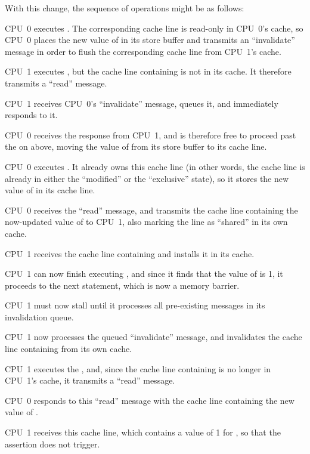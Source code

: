 \begin{fcvref}
With this change, the sequence of operations might be as follows:
\begin{sequence}
\item	CPU~0 executes .
	The corresponding cache line is read-only in CPU~0's cache,
	so CPU~0 places the new value of  in its store buffer and
	transmits an ``invalidate'' message in order to flush the
	corresponding cache line from CPU~1's cache.
\item	CPU~1 executes , but the cache line
	containing  is not in its cache.
	It therefore transmits a ``read'' message.
\item	CPU~1 receives CPU~0's ``invalidate'' message, queues it, and
	immediately responds to it.
\item	CPU~0 receives the response from CPU~1, and is therefore free
	to proceed past the  on  above, moving
	the value of  from its store buffer to its cache line.
\item	CPU~0 executes .
	It already owns this cache line (in other words, the cache line
	is already in either the ``modified'' or the ``exclusive'' state),
	so it stores the new value of  in its cache line.
\item	CPU~0 receives the ``read'' message, and transmits the
	cache line containing the now-updated value of 
	to CPU~1, also marking the line as ``shared'' in its own cache.
\item	CPU~1 receives the cache line containing  and installs
	it in its cache.
\item	CPU~1 can now finish executing ,
	and since it finds that the value of  is 1, it proceeds
	to the next statement, which is now a memory barrier.
\item	CPU~1 must now stall until it processes all pre-existing
	messages in its invalidation queue.
\item	CPU~1 now processes the queued
	``invalidate'' message, and
	invalidates the cache line containing  from its own cache.
\item	CPU~1 executes the , and, since the
	cache line containing  is no longer in CPU~1's cache,
	it transmits a ``read'' message.
\item	CPU~0 responds to this ``read'' message with the cache line
	containing the new value of .
\item	CPU~1 receives this cache line, which contains a value of 1 for
	, so that the assertion does not trigger.
\end{sequence}
\end{fcvref}

